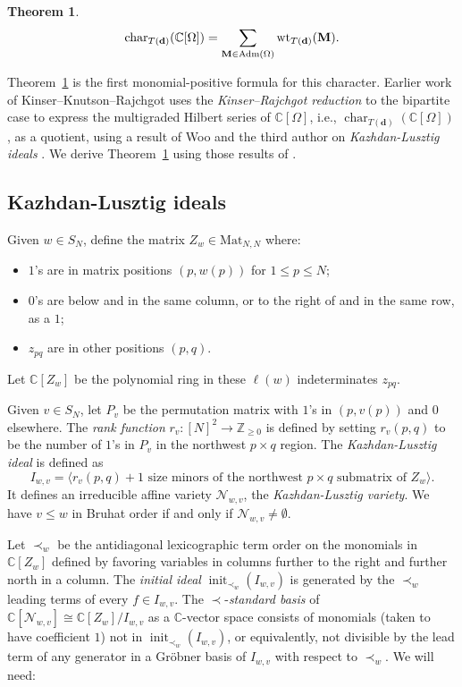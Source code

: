 \documentclass[12pt]{amsart}
\renewcommand{\d}{\mathbf{d}}
\DeclareMathOperator{\Std}{\operatorname{Adm}}
\newtheorem{theorem}{Theorem}[section]
\theoremstyle{definition}
\theoremstyle{remark}
\begin{document}
\begin{theorem}
\label{thm:poschar}
\[\operatorname{char}_{T(\d)}({\mathbb C}[\Omega])=\sum_{{\bf M}\in \Std(\Omega)} \operatorname{wt}_{T(\d)}({\bf M}).\]
\end{theorem}

Theorem~\ref{thm:poschar} is the first monomial-positive formula for this character. Earlier work of Kinser--Knutson--Rajchgot \cite{KKR} uses the \emph{Kinser--Rajchgot reduction} \cite{KinserRajchgot} 
to the bipartite case to express the multigraded Hilbert series of $\mathbb C[\Omega]$, i.e., 
$\operatorname{char}_{T(\d)}({\mathbb C}[\Omega])$,
as a quotient, using a result of Woo and the third author \cite{WooYong} on \emph{Kazhdan-Lusztig ideals} \cite{WooYong:JA}. We derive Theorem~\ref{thm:poschar} using those results of \cite{KKR, WooYong}.

\subsection{Kazhdan-Lusztig ideals}\label{sec:KLideals}
Given $w\in S_N$, define the matrix $Z_w\in \mathrm{Mat}_{N,N}$ where:
\begin{itemize}
\item $1$'s are in matrix positions $(p,w(p))$ for $1\leq p\leq N$;
\item $0$'s are below and in the same column, or to the right of and in the same row, as a $1$;
\item $z_{pq}$ are in other positions $(p,q)$.
\end{itemize}
Let ${\mathbb C}[Z_w]$ be the polynomial ring in these $\ell(w)$ indeterminates $z_{pq}$.

Given $v\in S_N$, let $P_v$ be the permutation matrix with $1$'s in $(p,v(p))$ and $0$ elsewhere.
The \emph{rank function} 
$r_v:[N]^2\to {\mathbb Z}_{\geq 0}$ 
is defined by setting $r_v(p,q)$ to be the
number of $1$'s in $P_v$ in the northwest $p\times q$ region.
The \emph{Kazhdan-Lusztig ideal} \cite{WooYong:JA} is defined as
\begin{equation}\label{eqn:defininggens}
I_{w,v}\!=\!\langle\text{$r_v(p,q)\!+\!1$ size minors of the northwest $p\!\times\! q$ submatrix
of $Z_w$}\rangle.
\end{equation}
 It defines an irreducible affine variety ${\mathcal N}_{w,v}$, the \emph{Kazhdan-Lusztig variety}. We have $v\leq w$ in Bruhat order if and only if ${\mathcal N}_{w,v}\neq \emptyset$. 

Let $\prec_w$ be the antidiagonal lexicographic term order on the monomials in ${\mathbb C}[Z_w]$ defined by favoring variables
in columns further to the right and further north in a column. 
The \emph{initial ideal} $\operatorname{init}_{\prec_w}(I_{w,v})$ is generated by the $\prec_w$ 
leading terms of every $f\in I_{w,v}$. The 
$\prec$-\emph{standard basis} of 
${\mathbb C}[{\mathcal N}_{w,v}]\cong {\mathbb C}[Z_{w}]/I_{w,v}$ 
as a ${\mathbb C}$-vector space consists of monomials (taken to have coefficient $1$) not 
in $\operatorname{init}_{\prec_w}(I_{w,v})$, or equivalently, not divisible by the lead term of any generator in a Gr\"obner basis
of $I_{w,v}$ with respect to $\prec_w$.  We will need:
\end{document}
